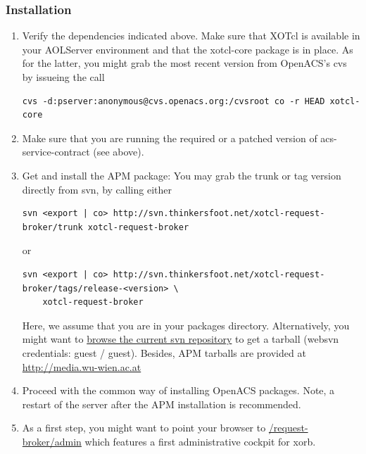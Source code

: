  	\subsubsection{Installation}
	\begin{enumerate}
	\item Verify the dependencies indicated above. Make sure that XOTcl is available in your AOLServer environment and that the xotcl-core package is in place. As for the latter, you might grab the most recent version from OpenACS's cvs by issueing the call 
	\begin{lstlisting}[breaklines=true,frame=single,basicstyle=\footnotesize]
	cvs -d:pserver:anonymous@cvs.openacs.org:/cvsroot co -r HEAD xotcl-core
	\end{lstlisting}
	\item Make sure that you are running the required or a patched version of acs-service-contract (see above).
	\item Get and install the APM package: You may grab the trunk or tag version directly from svn, by calling either
	\begin{lstlisting}[breaklines=true,frame=single,basicstyle=\footnotesize]
	svn <export | co> http://svn.thinkersfoot.net/xotcl-request-broker/trunk xotcl-request-broker
	\end{lstlisting}
	or
	\begin{lstlisting}[breaklines=true,frame=single,basicstyle=
\footnotesize]
	svn <export | co> http://svn.thinkersfoot.net/xotcl-request-broker/tags/release-<version> \
	xotcl-request-broker
	\end{lstlisting}
	Here, we assume that you are in your packages directory. Alternatively, you might want to \href{http://stefan.thinkersfoot.net/websvn/listing.php?repname=xotcl-request-broker&path=\%2F&sc=0}{browse the current svn repository} to get a tarball (websvn credentials: guest / guest). Besides, APM tarballs are provided at \href{http://media.wu-wien.ac.at/download/}{http://media.wu-wien.ac.at}
	\item Proceed with the common way of installing OpenACS packages. Note, a restart of the server after the APM installation is recommended.
	\item As a first step, you might want to point your browser to \href{/request-broker/admin}{/request-broker/admin} which features a first administrative cockpit for xorb.
	\end{enumerate}
